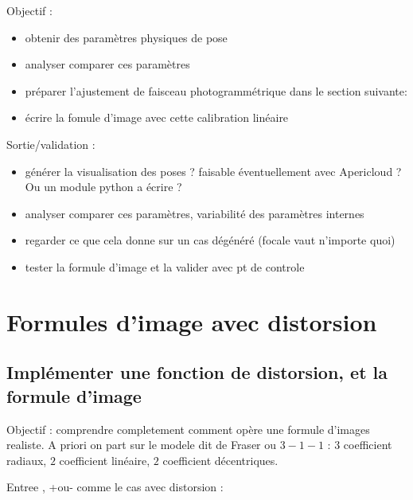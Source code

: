 Objectif :

\begin{itemize}
    \item obtenir des paramètres physiques de pose
    \item analyser comparer ces paramètres
    \item préparer l'ajustement de faisceau photogrammétrique dans le section suivante:
    \item écrire la fomule d'image avec cette calibration linéaire
\end{itemize}

Sortie/validation :

\begin{itemize}
    \item générer la visualisation des poses ?  faisable éventuellement
          avec Apericloud ? Ou un module python a écrire ?

    \item analyser comparer ces paramètres, variabilité des paramètres internes
    \item regarder ce que cela donne sur un cas dégénéré (focale vaut n'importe quoi)
    \item tester la formule d'image et la valider avec pt de controle
\end{itemize}


\section{Formules d'image avec distorsion}


\subsection{Implémenter une fonction de distorsion, et la formule d'image}

\label{TutoFormImD}

Objectif : comprendre completement comment opère une formule d'images realiste.
A priori on part sur le modele dit de Fraser ou  $3-1-1$ :
$3$ coefficient radiaux, $2$ coefficient linéaire, $2$ coefficient décentriques.

Entree , +ou- comme le cas avec distorsion :

